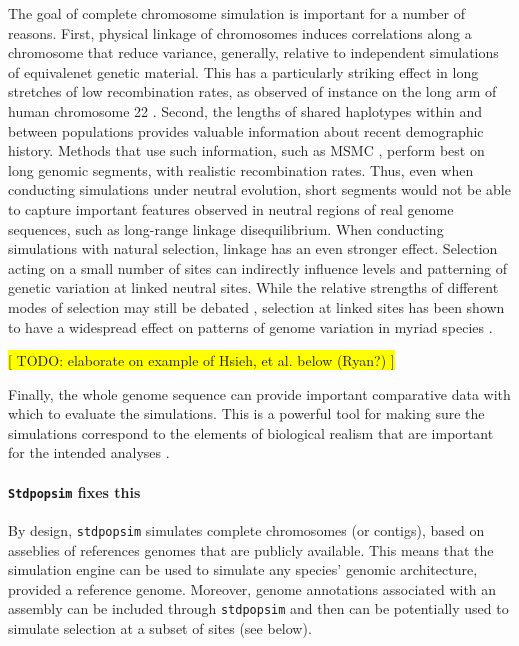 \documentclass[hidelinks]{article}
\newcommand{\Stdpopsim}{\texttt{Stdpopsim}\xspace}
\newcommand{\stdpopsim}{\texttt{stdpopsim}\xspace}
\begin{document}
The goal of complete chromosome simulation is important for a number of reasons.
First, physical linkage of chromosomes induces correlations along a chromosome that
reduce variance, generally, relative to independent simulations of equivalenet genetic material.
This has a particularly striking effect in long stretches of low recombination rates,
as observed of instance on the long arm of human chromosome 22 \citep{Dawson2002}.
Second, the lengths of shared haplotypes within and
between populations provides valuable information about recent demographic history.
Methods that use such information, such as MSMC \citep{Schiffels2020}, perform best
on long genomic segments, with realistic recombination rates.
Thus, even when conducting simulations under neutral evolution, short segments
would not be able to capture important features observed in neutral regions of
real genome sequences, such as long-range linkage disequilibrium.
%
When conducting simulations with natural selection, linkage has
an even stronger effect. Selection acting on a small number of sites can
indirectly influence levels and patterning of genetic variation at linked
neutral sites. While the relative strengths of different modes of selection
may still be debated \citep{kern2018neutral,jensen2019importance}, 
selection at linked sites has been shown to have a widespread
effect on patterns of genome variation in myriad species
\citep[e.g.,][]{McVicker2009,Charlesworth2012}.

\noindent\colorbox{yellow}
{[ TODO: elaborate on example of Hsieh, et al. below (Ryan?) ]}

Finally, the whole genome sequence can provide important comparative
data with which to evaluate the simulations. This is a powerful tool for
making sure the simulations correspond to the elements of biological
realism that are important for the intended analyses \citep{Hsieh2016a}. 

\paragraph*{\Stdpopsim fixes this}
By design, \texttt{\stdpopsim} simulates complete chromosomes (or contigs),
based on asseblies of references genomes that are publicly available. 
This means that the simulation engine can be used to simulate any species'
genomic architecture, provided a reference genome. Moreover, genome
annotations associated with an assembly can be included through \stdpopsim
and then can be potentially used to simulate selection at a subset of sites
(see below).
\end{document}
